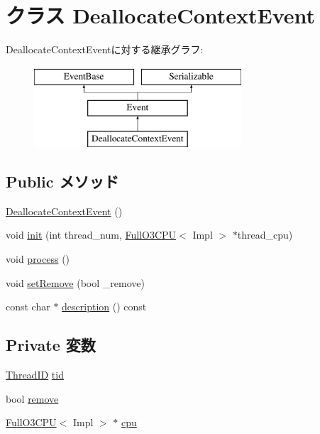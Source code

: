 \hypertarget{classFullO3CPU_1_1DeallocateContextEvent}{
\section{クラス DeallocateContextEvent}
\label{classFullO3CPU_1_1DeallocateContextEvent}
}
DeallocateContextEventに対する継承グラフ:\begin{figure}[H]
\begin{center}
\leavevmode
\includegraphics[height=3cm]{classFullO3CPU_1_1DeallocateContextEvent}
\end{center}
\end{figure}
\subsection*{Public メソッド}
\begin{DoxyCompactItemize}
\item 
\hyperlink{classFullO3CPU_1_1DeallocateContextEvent_aae8f83c8487667ebbcfe7aef32c7468f}{DeallocateContextEvent} ()
\item 
void \hyperlink{classFullO3CPU_1_1DeallocateContextEvent_a0938c51f296f212d5f6f05d174558612}{init} (int thread\_\-num, \hyperlink{classFullO3CPU}{FullO3CPU}$<$ Impl $>$ $\ast$thread\_\-cpu)
\item 
void \hyperlink{classFullO3CPU_1_1DeallocateContextEvent_a2e9c5136d19b1a95fc427e0852deab5c}{process} ()
\item 
void \hyperlink{classFullO3CPU_1_1DeallocateContextEvent_afcccb6b285c8de11c79413e7d2d33928}{setRemove} (bool \_\-remove)
\item 
const char $\ast$ \hyperlink{classFullO3CPU_1_1DeallocateContextEvent_a5a14fe478e2393ff51f02e9b7be27e00}{description} () const 
\end{DoxyCompactItemize}
\subsection*{Private 変数}
\begin{DoxyCompactItemize}
\item 
\hyperlink{base_2types_8hh_ab39b1a4f9dad884694c7a74ed69e6a6b}{ThreadID} \hyperlink{classFullO3CPU_1_1DeallocateContextEvent_aa508770268ee4ceaf16054b9e0be0e17}{tid}
\item 
bool \hyperlink{classFullO3CPU_1_1DeallocateContextEvent_a85e26bd0985e6b9f842e0f195beccb6c}{remove}
\item 
\hyperlink{classFullO3CPU}{FullO3CPU}$<$ Impl $>$ $\ast$ \hyperlink{classFullO3CPU_1_1DeallocateContextEvent_a3a3767255bcefd2ce55f94976ab8eb99}{cpu}
\end{DoxyCompactItemize}
